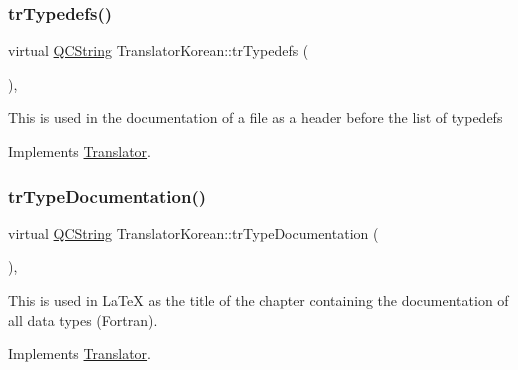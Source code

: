 \mbox{\label{class_translator_korean_afd7669c5e1cdc57395490ad2fa7312b2}} 
\subsubsection{\texorpdfstring{trTypedefs()}{trTypedefs()}}
{\footnotesize\ttfamily virtual \mbox{\hyperlink{class_q_c_string}{Q\+C\+String}} Translator\+Korean\+::tr\+Typedefs (\begin{DoxyParamCaption}{ }\end{DoxyParamCaption})\hspace{0.3cm}{\ttfamily [inline]}, {\ttfamily [virtual]}}

This is used in the documentation of a file as a header before the list of typedefs 

Implements \mbox{\hyperlink{class_translator}{Translator}}.

\mbox{\label{class_translator_korean_aa90ae72e2809467cd71af1875b2d2d6a}} 
\subsubsection{\texorpdfstring{trTypeDocumentation()}{trTypeDocumentation()}}
{\footnotesize\ttfamily virtual \mbox{\hyperlink{class_q_c_string}{Q\+C\+String}} Translator\+Korean\+::tr\+Type\+Documentation (\begin{DoxyParamCaption}{ }\end{DoxyParamCaption})\hspace{0.3cm}{\ttfamily [inline]}, {\ttfamily [virtual]}}

This is used in La\+TeX as the title of the chapter containing the documentation of all data types (Fortran). 

Implements \mbox{\hyperlink{class_translator}{Translator}}.

\mbox{\label{class_translator_korean_acf0731c412807d9242edf0c959819264}} 
